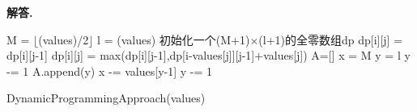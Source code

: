 \documentclass[12pt, a4paper, oneside]{article}
\newenvironment{solution}{\par\noindent\textbf{解答. }}{}
\begin{document}
\begin{solution}
\begin{algorithm}[H]
    \;
    M = $\lfloor$\sum(values)/2$\rfloor$\;
    l = \len(values)\;
    初始化一个(M+1)$\times$(l+1)的全零数组dp\;
    {
        {
            {
                dp[i][j] = dp[i][j-1]\;
            }{
                dp[i][j] = max(dp[i][j-1],dp[i-values[j]][j-1]+values[j])
            }
        }
    }
    A=[]\;
    x = M\;
    y = l\;
    {
        {
            y -= 1
        }
        A.append(y)\;
        x -= values[y-1]\;
        y -= 1\;
    }
    \caption{DynamicProgrammingApproach(values)}
\end{algorithm}

\end{solution}
\end{document}
